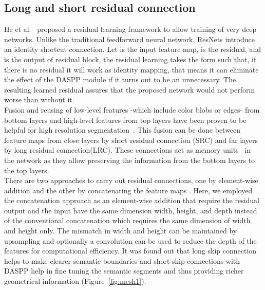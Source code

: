 \documentclass[conference,a4paper]{IEEEtran}
\begin{document}
\subsection{Long and short residual connection}
\label{sec:4}
He et al.~\cite{resnet} proposed a residual learning framework to allow training of very deep networks. Unlike the traditional feedforward neural network, ResNets introduce an identity shortcut connection. Let  is the input feature map,  is the residual, and  is the output of residual block, the residual learning takes the form  such that, if there is no residual it will work as identity mapping, that means it can eliminate the effect of the DASPP module if it turns out to be an unnecessary. The resulting learned residual assures that the proposed network would not perform worse than without it.\\
Fusion and reusing of low-level features -which include color blobs or edges- from bottom layers and high-level features from top layers have been proven to be helpful for high resolution segmentation~\cite{zhang2018exfuse}. This fusion can be done between feature maps from close layers by short residual connection (SRC) and far layers by long residual connection(LRC). These connections act as memory units~\cite{densenet} in the network as they allow preserving the information from the bottom layers to the top layers.\\
There are two approaches to carry out residual connections, one by element-wise addition \cite{resnet} and the other by concatenating the feature maps \cite{densenet}. Here, we employed the concatenation approach as an element-wise addition that require the residual output and the input have the same dimension width, height, and depth instead of the conventional concatenation which requires the same dimension of width and height only. The mismatch in width and height can be maintained by upsampling and optionally a  convolution can be used to reduce the depth of the features for computational efficiency. It was found out that long skip connection helps to make clearer semantic boundaries and short skip connections with DASPP help in fine tuning the semantic segments and thus providing richer geometrical information (Figure~\ref{fig:mesh1}).
\end{document}
